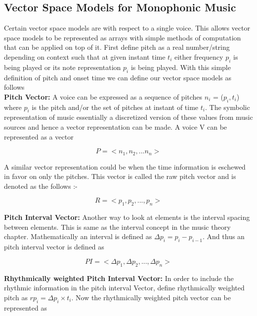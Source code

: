 \subsection{Vector Space Models for Monophonic Music}

\noindent Certain vector space models are with respect to a single voice. This allows vector space models to be represented as arrays with simple methods of computation that can be applied on top of it. First define pitch as a real number/string depending on context such that at given instant time $t_i$ either frequency $p_i$ is being played or its note representation $p_i$ is being played. With this simple definition of pitch and onset time we can define our vector space models as follows\\
 
\noindent \textbf{Pitch Vector:} A voice can be expressed as a sequence of pitches $n_i$ = ($p_i, t_i$) where $p_i$ is the pitch and/or the set of pitches at instant of time $t_i$. The symbolic representation of music essentially a discretized version of these values from music sources and hence a vector representation can be made. A voice V can be represented as a vector

\begin{equation}
P = <n_1, n_2, ... n_n>
\end{equation}

\noindent A similar vector representation could be when the time information is eschewed in favor on only the pitches. This vector is called the raw pitch vector and is denoted as the follows :-

\begin{equation} \label{eq:rawpitch}
R = <p_1, p_2, ..., p_n>
\end{equation}

\noindent \textbf{Pitch Interval Vector:} Another way to look at elements is the interval spacing between elements. This is same as the interval concept in the music theory chapter. Mathematically an interval is defined as $\Delta p_i = p_i - p_{i-1}$. And thus an pitch interval vector is defined as

\begin{equation}
PI = <\Delta p_1, \Delta p_2, ... , \Delta p_n>
\end{equation}

\noindent \textbf{Rhythmically weighted Pitch Interval Vector:} In order to include the rhythmic information in the pitch interval Vector, define rhythmically weighted pitch as $rp_i = \Delta p_i \times t_i$. Now the rhythmically weighted pitch vector can be represented as

